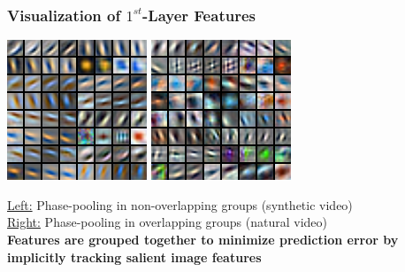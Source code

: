 \documentclass{beamer}
\begin{document}
\begin{frame} 
\frametitle{Visualization of $1^{st}$-Layer Features}
\begin{center} 
\includegraphics[scale=0.6]{./Figures/Project2/pretty_decoder.png} \hspace{1cm} 
\includegraphics[scale=0.6]{./Figures/Project2/dec200.png} 
\end{center} 
\underline{Left:} Phase-pooling in non-overlapping groups (synthetic video) \\
\underline{Right:} Phase-pooling in overlapping groups (natural video) \\ \vspace{0.5cm} 
\textbf{Features are grouped together to minimize prediction error by implicitly tracking salient image features}
\end{frame} 
\end{document}

